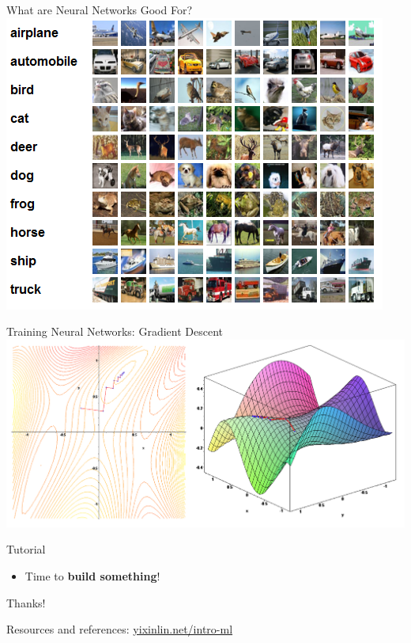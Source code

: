 \documentclass{beamer}
\begin{document}
\begin{frame}{What are Neural Networks Good For?}
    \includegraphics[scale=0.7]{cifar_preview.png}
\end{frame}

\begin{frame}{Training Neural Networks: Gradient Descent}
\includegraphics[scale=0.4]{gradient.png}
\end{frame}

\begin{frame}{Tutorial}
\begin{itemize}
    \item Time to \textbf{build something}!
\end{itemize}

\end{frame}

\begin{frame}
\Huge{\centerline{Thanks!}}

\Large{\centerline{Resources and references: \href{http://yixinlin.net/intro-ml}{yixinlin.net/intro-ml}}}

\end{frame}

\end{document}
